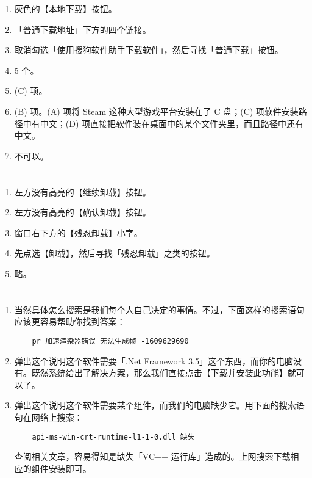 \begin{enumerate}
  \item 灰色的【本地下载】按钮。
  \item 「普通下载地址」下方的四个链接。
  \item 取消勾选「使用搜狗软件助手下载软件」，然后寻找「普通下载」按钮。
  \item 5 个。
  \item (C) 项。
  \item (B) 项。(A) 项将 Steam 这种大型游戏平台安装在了 C 盘；(C) 项软件安装路径中有中文；(D) 项直接把软件装在桌面中的某个文件夹里，而且路径中还有中文。
  \item 不可以。
\end{enumerate}

\section{}

\begin{enumerate}
  \item 左方没有高亮的【继续卸载】按钮。
  \item 左方没有高亮的【确认卸载】按钮。
  \item 窗口右下方的【残忍卸载】小字。
  \item 先点选【卸载】，然后寻找「残忍卸载」之类的按钮。
  \item 略。
\end{enumerate}

\section{}

\begin{enumerate}
  \item 当然具体怎么搜索是我们每个人自己决定的事情。不过，下面这样的搜索语句应该更容易帮助你找到答案：
  \begin{verbatim}
    pr 加速渲染器错误 无法生成帧 -1609629690
  \end{verbatim}
  \item 弹出这个说明这个软件需要「.Net Framework 3.5」这个东西，而你的电脑没有。既然系统给出了解决方案，那么我们直接点击【下载并安装此功能】就可以了。
  \item 弹出这个说明这个软件需要某个组件，而我们的电脑缺少它。用下面的搜索语句在网络上搜索：
  
  \begin{verbatim}
    api-ms-win-crt-runtime-l1-1-0.dll 缺失
  \end{verbatim}

  查阅相关文章，容易得知是缺失「VC++ 运行库」造成的。上网搜索下载相应的组件安装即可。
\end{enumerate}

